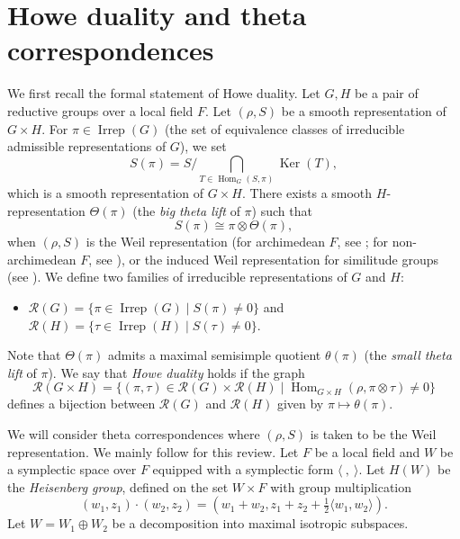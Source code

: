 \documentclass[11pt]{article}
\theoremstyle{plain}
\theoremstyle{remark}
\theoremstyle{definition}
\DeclareMathOperator{\Ker}{Ker}
\DeclareMathOperator{\Hom}{Hom}
\DeclareMathOperator{\irr}{Irrep}
\begin{document}
\section{Howe duality and theta correspondences}\label{sltheta}

We first recall the formal statement of Howe duality.
Let $G,H$ be a pair of reductive groups over a local field $F$.
Let $(\rho,S)$ be a smooth representation of $G\times H$.
For $\pi\in \irr(G)$ (the set of equivalence classes of irreducible admissible representations of $G$), we set
\begin{equation}\label{eSpi}
    S(\pi)=S/\bigcap\limits_{T\in \Hom_{G}(S,\pi)}\Ker(T),
\end{equation}
which is a smooth representation of $G\times H$.
There exists a smooth $H$-representation $\Theta(\pi)$ (the \emph{big theta lift} of $\pi$) such that
\begin{equation}\label{eHowe}
S(\pi)\cong \pi\otimes\Theta(\pi),
\end{equation}
when $(\rho,S)$ is the Weil representation (for archimedean $F$, see \cite[Section~2]{Howe89}; for non-archimedean $F$, see \cite[Lemma~III.3]{MVW87}), or the induced Weil representation for similitude groups (see \cite[Section~3]{BGS2024}).
We define two families of irreducible representations of $G$ and $H$:
\begin{itemize}
\item $\mathcal{R}(G)=\{\pi\in\irr(G)\mid S(\pi)\neq 0\}$ and $\mathcal{R}(H)=\{\tau\in\irr(H)\mid S(\tau)\neq 0\}$.
\end{itemize}
Note that $\Theta(\pi)$ admits a maximal semisimple quotient $\theta(\pi)$ (the \emph{small theta lift} of $\pi$).
We say that \emph{Howe duality} holds if the graph
\[
\mathcal{R}(G\times H)=\{(\pi,\tau)\in \mathcal{R}(G)\times \mathcal{R}(H)\mid \Hom_{G\times H}(\rho,\pi\otimes\tau)\neq 0\}
\]
defines a bijection between $\mathcal{R}(G)$ and $\mathcal{R}(H)$ given by $\pi \mapsto \theta(\pi)$.

We will consider theta correspondences where $(\rho,S)$ is taken to be the Weil representation.
We mainly follow \cite{PrasadD1993,Gan2024} for this review.
Let $F$ be a local field and $W$ be a symplectic space over $F$ equipped with a symplectic form $\langle~,~\rangle$.
Let $H(W)$ be the \emph{Heisenberg group}, defined on the set $W\times F$ with group multiplication
\[
(w_1,z_1)\cdot (w_2,z_2)=(w_1+w_2,z_1+z_2+\tfrac{1}{2}\langle w_1,w_2\rangle).
\]
Let $W=W_1\oplus W_2$ be a decomposition into maximal isotropic subspaces.
\end{document}

